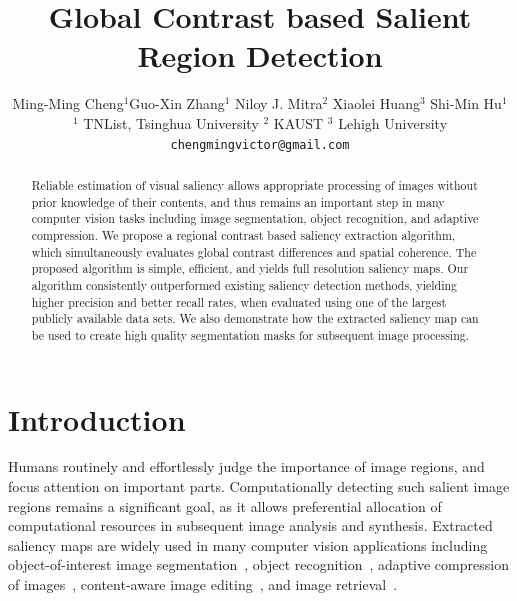 \documentclass[final]{cvpr}
\begin{document}

\title{Global Contrast based Salient Region Detection}

\author{Ming-Ming Cheng$^{1}$\quad Guo-Xin Zhang$^{1}$ \quad Niloy J. Mitra$^{2}$
    \quad Xiaolei Huang$^{3}$  \quad Shi-Min Hu$^{1}$  \\
    $^{1}$ TNList, Tsinghua University \quad \quad
    $^2$ KAUST   \quad \quad $^3$ Lehigh University\\
    {\tt \small chengmingvictor@gmail.com}
}

\maketitle

\begin{abstract}
%
Reliable estimation of visual saliency allows appropriate processing of images without prior
knowledge of their contents, and thus remains an important step in many computer vision tasks
including image segmentation, object recognition, and adaptive compression.
%
We propose a regional contrast based saliency extraction algorithm,
which simultaneously evaluates global contrast differences and spatial coherence.
%
The proposed algorithm is simple, efficient, and yields full resolution saliency maps.
%
Our algorithm consistently outperformed existing saliency detection methods, yielding
higher precision and better recall rates, when evaluated using one of the largest
publicly available data sets.
%
We also demonstrate how the extracted saliency map can be used to create high quality
segmentation masks for subsequent image processing.


\end{abstract}




\section{Introduction}\label{sec:Introduction}

Humans routinely and effortlessly judge the importance of image regions, and focus
attention on important parts.
%
Computationally detecting such salient image regions remains a significant goal,
as it allows preferential allocation of computational resources in subsequent image analysis and synthesis.
%
Extracted saliency maps are widely used in many computer vision applications including object-of-interest
image segmentation~\cite{06TCSVT/han_unsupervised,06josa/KoN_InterestSegmentation},
object recognition~\cite{04cvpr/RutishauserWWKP},  adaptive compression of images~\cite{00CE/christopoulos_jpeg},
content-aware image editing~\cite{TOG/Wang08,09cgf/ZhangC,wu-2010-resizing,10vc/Ding}, and image retrieval~\cite{tog09/ChenCT_Sketch2Photo}.
\end{document}
